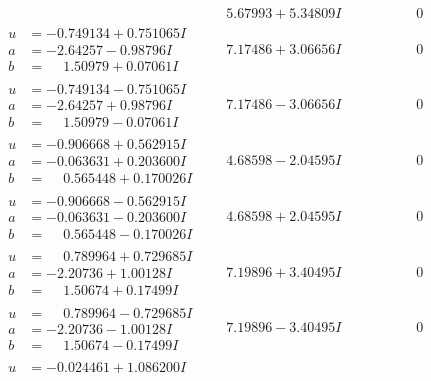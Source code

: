 \documentclass[1p]{elsarticle_modified}
\theoremstyle{definition}
\begin{document}
$$\begin{array}{c|c|c}
 & \phantom{-}5.67993 + 5.34809 I & \phantom{-0.000000 } 0 \\ \hline\begin{aligned}
u &= -0.749134 + 0.751065 I \\
a &= -2.64257 - 0.98796 I \\
b &= \phantom{-}1.50979 + 0.07061 I\end{aligned}
 & \phantom{-}7.17486 + 3.06656 I & \phantom{-0.000000 } 0 \\ \hline\begin{aligned}
u &= -0.749134 - 0.751065 I \\
a &= -2.64257 + 0.98796 I \\
b &= \phantom{-}1.50979 - 0.07061 I\end{aligned}
 & \phantom{-}7.17486 - 3.06656 I & \phantom{-0.000000 } 0 \\ \hline\begin{aligned}
u &= -0.906668 + 0.562915 I \\
a &= -0.063631 + 0.203600 I \\
b &= \phantom{-}0.565448 + 0.170026 I\end{aligned}
 & \phantom{-}4.68598 - 2.04595 I & \phantom{-0.000000 } 0 \\ \hline\begin{aligned}
u &= -0.906668 - 0.562915 I \\
a &= -0.063631 - 0.203600 I \\
b &= \phantom{-}0.565448 - 0.170026 I\end{aligned}
 & \phantom{-}4.68598 + 2.04595 I & \phantom{-0.000000 } 0 \\ \hline\begin{aligned}
u &= \phantom{-}0.789964 + 0.729685 I \\
a &= -2.20736 + 1.00128 I \\
b &= \phantom{-}1.50674 + 0.17499 I\end{aligned}
 & \phantom{-}7.19896 + 3.40495 I & \phantom{-0.000000 } 0 \\ \hline\begin{aligned}
u &= \phantom{-}0.789964 - 0.729685 I \\
a &= -2.20736 - 1.00128 I \\
b &= \phantom{-}1.50674 - 0.17499 I\end{aligned}
 & \phantom{-}7.19896 - 3.40495 I & \phantom{-0.000000 } 0 \\ \hline\begin{aligned}
u &= -0.024461 + 1.086200 I \\

\end{aligned}
\end{array}$$
\end{document}
